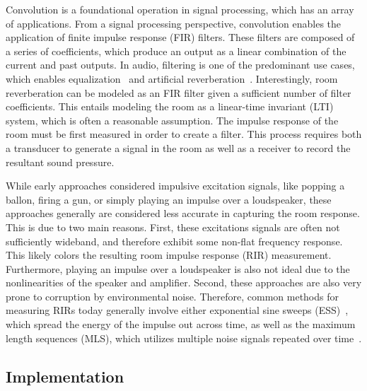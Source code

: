 \documentclass{article}
\begin{document}
Convolution is a foundational operation in signal processing, which has an array of applications. 
From a signal processing perspective, convolution enables the application of finite impulse response (FIR) filters.
These filters are composed of a series of coefficients, which produce an output as a linear combination of the current and past outputs. 
In audio, filtering is one of the predominant use cases, which enables equalization~\cite{valimaki2016all} and artificial reverberation~\cite{valimaki2016more}.
Interestingly, room reverberation can be modeled as an FIR filter given a sufficient number of filter coefficients. 
This entails modeling the room as a linear-time invariant (LTI) system, which is often a reasonable assumption.
The impulse response of the room must be first measured in order to create a filter. 
This process requires both a transducer to generate a signal in the room as well as a receiver to record the resultant sound pressure. 

While early approaches considered impulsive excitation signals, 
like popping a ballon, firing a gun, or simply playing an impulse over a loudspeaker, 
these approaches generally are considered less accurate in capturing the room response. 
This is due to two main reasons. 
First, these excitations signals are often not sufficiently wideband, and therefore exhibit some non-flat frequency response.
This likely colors the resulting room impulse response (RIR) measurement. 
Furthermore, playing an impulse over a loudspeaker is also not ideal due to the nonlinearities of the speaker and amplifier. 
Second, these approaches are also very prone to corruption by environmental noise.
Therefore, common methods for measuring RIRs today generally involve 
either exponential sine sweeps (ESS)~\cite{farina2000simultaneous}, which spread the energy of the impulse out across time, 
as well as the maximum length sequences (MLS), which utilizes multiple noise signals repeated over time~\cite{stan2002comparison}. 

\subsection{Implementation}
\end{document}
